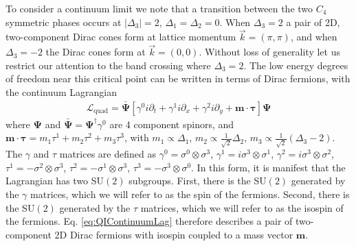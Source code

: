 \documentclass[%
 reprint,
 amsmath,amssymb,
 aps,
]{revtex4-1}
\begin{document}
To consider a continuum limit we note that a  transition between the two $C_4$ symmetric phases occurs at $|\Delta_3| = 2$, $\Delta_1 = \Delta_2 = 0$. When $\Delta_3 = 2$ a pair of 2D, two-component Dirac cones form at lattice momentum $\vec{k} = (\pi,\pi)$, and when $\Delta_3 = -2$ the Dirac cones form at $\vec{k} = (0,0)$. Without loss of generality let us restrict our attention to the band crossing where $\Delta_3 = 2.$ The low energy degrees of freedom near this critical point can be written in terms of Dirac fermions, with the continuum Lagrangian
\begin{equation}\begin{split}
\mathcal{L}_{\text{quad}} = \bar{\bm{\Psi}} [\gamma^0 i\partial_t + \gamma^1 i\partial_x + \gamma^2 i\partial_y + \bm{m}\cdot \bm{\tau}] \bm{\Psi}
\label{eq:QIContinuumLag}\end{split}\end{equation}
where $\bm{\Psi}$ and $\bar{\bm{\Psi}} = \bm{\Psi}^\dagger \gamma^0$ are 4 component spinors, and $\bm{m}\cdot \bm{\tau} = m_1 \tau^1 + m_2 \tau^2 + m_3 \tau^3$, with $m_1 \propto \Delta_1$, $m_2 \propto \frac{1}{\sqrt{2}}\Delta_2$, $m_3 \propto \frac{1}{\sqrt{2}}(\Delta_3-2)$. The $\gamma$ and $\tau$ matrices are defined as $\gamma^0 = \sigma^0 \otimes \sigma^3$, $\gamma^1 = i \sigma^3 \otimes \sigma^1$, $\gamma^2 = i \sigma^3 \otimes \sigma^2$, $\tau^1 = -\sigma^2\otimes \sigma^3$, $\tau^2 = -\sigma^1\otimes \sigma^3$, $\tau^3 = -\sigma^3\otimes \sigma^0$. In this form, it is manifest that the Lagrangian has two SU$(2)$ subgroups. First, there is the SU$(2)$ generated by the $\gamma$ matrices, which we will refer to as the spin of the fermions. Second, there is the SU$(2)$ generated by the $\tau$ matrices, which we will refer to as the isospin of the fermions. Eq. \ref{eq:QIContinuumLag} therefore describes a pair of two-component 2D Dirac fermions with isospin coupled to a mass vector $\bm{m}$. 
\end{document}
